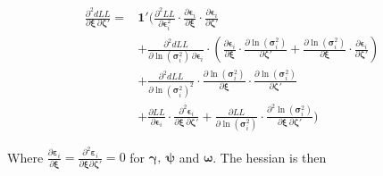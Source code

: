 \documentclass[12pt]{article}
\begin{document}
\begin{align}
\frac{\partial^{2} dLL}{\partial \boldsymbol{\xi} \, \partial \boldsymbol{\zeta}'} = {} & 
\mathbf{1}' \Bigg(
\frac{\partial^{2} LL}{\partial \boldsymbol{\epsilon}_{i}^{2}} 
\cdot \frac{\partial \boldsymbol{\epsilon}_{i}}{\partial \boldsymbol{\xi}} 
\cdot \frac{\partial \boldsymbol{\epsilon}_{i}}{\partial \boldsymbol{\zeta}'} \nonumber \\
& + \frac{\partial^{2} dLL}{\partial \ln\left( \boldsymbol{\sigma}_{i}^{2} \right) \, \partial \boldsymbol{\epsilon}_{i}} 
\cdot \left(
\frac{\partial \boldsymbol{\epsilon}_{i}}{\partial \boldsymbol{\xi}} 
\cdot \frac{\partial \ln\left( \boldsymbol{\sigma}_{i}^{2} \right)}{\partial \boldsymbol{\zeta}'} 
+ \frac{\partial \ln\left( \boldsymbol{\sigma}_{i}^{2} \right)}{\partial \boldsymbol{\xi}} 
\cdot \frac{\partial \boldsymbol{\epsilon}_{i}}{\partial \boldsymbol{\zeta}'} 
\right) \nonumber \\
& + \frac{\partial^{2} dLL}{\partial \ln\left( \boldsymbol{\sigma}_{i}^{2} \right)^{2}} 
\cdot \frac{\partial \ln\left( \boldsymbol{\sigma}_{i}^{2} \right)}{\partial \boldsymbol{\xi}} 
\cdot \frac{\partial \ln\left( \boldsymbol{\sigma}_{i}^{2} \right)}{\partial \boldsymbol{\zeta}'} \nonumber \\
& + \frac{\partial LL}{\partial \boldsymbol{\epsilon}_{i}} 
\cdot \frac{\partial^{2} \boldsymbol{\epsilon}_{i}}{\partial \boldsymbol{\xi} \, \partial \boldsymbol{\zeta}'} 
+ \frac{\partial LL}{\partial \ln\left( \boldsymbol{\sigma}_{i}^{2} \right)} 
\cdot \frac{\partial^{2} \ln\left( \boldsymbol{\sigma}_{i}^{2} \right)}{\partial \boldsymbol{\xi} \, \partial \boldsymbol{\zeta}'} 
\Bigg)
\label{eq:H4}
\end{align}


Where $\frac{\partial\mathbf{\varepsilon}_{i}}{\partial\mathbf{\xi}} = \frac{\partial^{2}\mathbf{\varepsilon}_{i}}{\partial\mathbf{\xi}\partial\mathbf{\zeta'}} = 0$ for $\mathbf{\gamma,\ \psi}$ and $\mathbf{\omega}$. The hessian is
then
\end{document}

